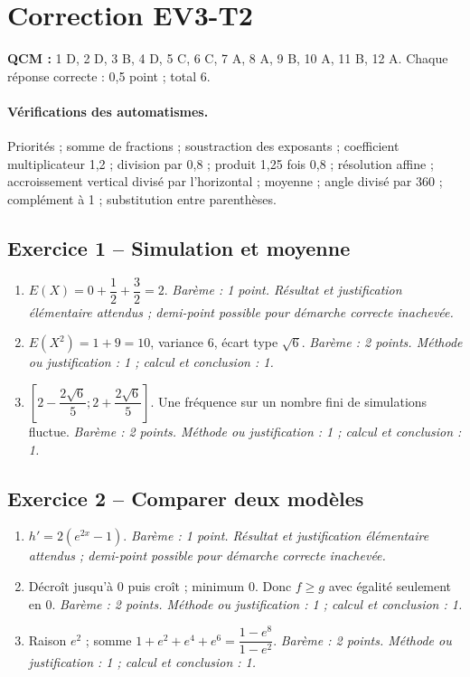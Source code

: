 \clearpage\section*{Correction EV3-T2}\label{EV3-T2-CORR}
\textbf{QCM :} 1 D, 2 D, 3 B, 4 D, 5 C, 6 C, 7 A, 8 A, 9 B, 10 A, 11 B, 12 A. Chaque réponse correcte : 0,5 point ; total 6.
\paragraph{Vérifications des automatismes.} Priorités ; somme de fractions ; soustraction des exposants ; coefficient multiplicateur 1,2 ; division par 0,8 ; produit 1,25 fois 0,8 ; résolution affine ; accroissement vertical divisé par l’horizontal ; moyenne ; angle divisé par 360 ; complément à 1 ; substitution entre parenthèses.
\subsection*{Exercice 1 -- Simulation et moyenne}
\begin{enumerate}
\item $E(X)=0+\dfrac{1}{2}+\dfrac{3}{2}=2$. \textit{Barème : 1 point. Résultat et justification élémentaire attendus ; demi-point possible pour démarche correcte inachevée.}
\item $E(X^2)=1+9=10$, variance 6, écart type $\sqrt6$. \textit{Barème : 2 points. Méthode ou justification : 1 ; calcul et conclusion : 1.}
\item $[2-\dfrac{2\sqrt 6}{5};2+\dfrac{2\sqrt 6}{5}]$. Une fréquence sur un nombre fini de simulations fluctue. \textit{Barème : 2 points. Méthode ou justification : 1 ; calcul et conclusion : 1.}
\end{enumerate}
\subsection*{Exercice 2 -- Comparer deux modèles}
\begin{enumerate}
\item $h\prime=2(e^{2x}-1)$. \textit{Barème : 1 point. Résultat et justification élémentaire attendus ; demi-point possible pour démarche correcte inachevée.}
\item Décroît jusqu’à 0 puis croît ; minimum 0. Donc $f\geq g$ avec égalité seulement en 0. \textit{Barème : 2 points. Méthode ou justification : 1 ; calcul et conclusion : 1.}
\item Raison $e^2$ ; somme $1+e^2+e^4+e^6=\dfrac{1-e^8}{1-e^2}$. \textit{Barème : 2 points. Méthode ou justification : 1 ; calcul et conclusion : 1.}
\end{enumerate}
